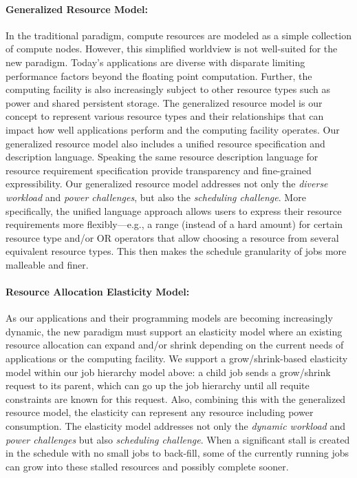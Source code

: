 \documentclass{article}
\begin{document}
\paragraph{Generalized Resource Model:}
In the traditional paradigm, compute resources are modeled as a simple collection of compute nodes. 
However, this simplified worldview is not well-suited for the new paradigm. 
Today's applications are diverse with disparate limiting performance 
factors beyond the floating point computation. Further, the computing facility
is also increasingly subject to other resource types such as power
and shared persistent storage. The generalized resource model is our concept
to represent various resource types and their relationships 
that can impact how well applications perform and the computing
facility operates. Our generalized resource model also includes a
unified resource specification and description language. Speaking the
same resource description language for resource requirement specification 
provide transparency and fine-grained expressibility.
Our generalized resource model addresses not only the {\sl diverse workload}
and {\sl power challenges}, but also the {\sl scheduling challenge}. More specifically, 
the unified language approach allows users to express their resource requirements
more flexibly---e.g., a range (instead of a hard amount) for certain resource type and/or OR operators
that allow choosing a resource from several equivalent resource types. This then makes the
schedule granularity of jobs more malleable and finer. 


\paragraph{Resource Allocation Elasticity Model:}
As our applications and their programming models are becoming increasingly
dynamic, the new paradigm must support an elasticity model where an existing
resource allocation can expand and/or shrink depending on the current needs
of applications or the computing facility. We support a grow/shrink-based
elasticity model within our job hierarchy model above: a child job sends
a grow/shrink request to its parent, which can go up the job hierarchy
until all requite constraints are known for this request. Also, combining
this with the generalized resource model, the elasticity can represent
any resource including power consumption. The elasticity model addresses
not only the {\sl dynamic workload} and {\sl power challenges} but also
{\sl scheduling challenge}. When a significant stall is created in the
schedule with no small jobs to back-fill, some of the currently running
jobs can grow into these stalled resources and possibly complete sooner.  
\end{document}
